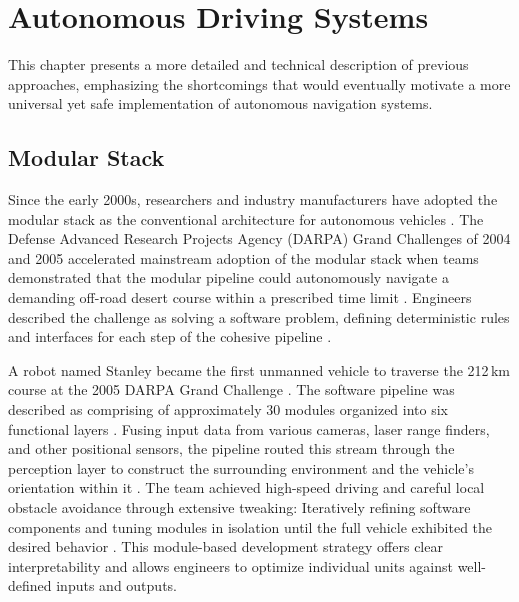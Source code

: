 
\chapter{Autonomous Driving Systems}
\label{chapter:AutonomousDrivingSystems}

This chapter presents a more detailed and technical description of previous approaches, emphasizing the shortcomings that would eventually motivate a more universal yet safe implementation of autonomous navigation systems.

\section{Modular Stack}
\label{section:ModularStack}

Since the early 2000s, researchers and industry manufacturers have adopted the modular stack as the conventional architecture for autonomous vehicles \cite{jain_Autonomy_20_2021, wang_VersatileEfficientReinforcement_2022,tampuu_SurveyEndtoEndDriving_2022}.
The Defense Advanced Research Projects Agency (DARPA) Grand Challenges of 2004 and 2005 accelerated mainstream adoption of the modular stack when teams demonstrated that the modular pipeline could autonomously navigate a demanding off-road desert course within a prescribed time limit \cite{tampuu_SurveyEndtoEndDriving_2022,wang_VersatileEfficientReinforcement_2022,thrun_stanley_2006}.
Engineers described the challenge as solving a software problem, defining deterministic rules and interfaces for each step of the cohesive pipeline \cite{thrun_stanley_2006, montemerlo_winning_2006}.

A robot named Stanley became the first unmanned vehicle to traverse the 212\,km course at the 2005 DARPA Grand Challenge \cite{tampuu_SurveyEndtoEndDriving_2022, hoffmann_AutonomousAutomobileTrajectory_2007, thrun_stanley_2006}.
The software pipeline was described as comprising of approximately 30 modules organized into six functional layers \cite{tampuu_SurveyEndtoEndDriving_2022, thrun_stanley_2006, montemerlo_winning_2006}.
Fusing input data from various cameras, laser range finders, and other positional sensors, the pipeline routed this stream through the perception layer to construct the surrounding environment and the vehicle's orientation within it \cite{thrun_stanley_2006}.
The team achieved high-speed driving and careful local obstacle avoidance through extensive tweaking: Iteratively refining software components and tuning modules in isolation until the full vehicle exhibited the desired behavior \cite{thrun_stanley_2006, montemerlo_winning_2006}.
This module-based development strategy offers clear interpretability and allows engineers to optimize individual units against well-defined inputs and outputs.

